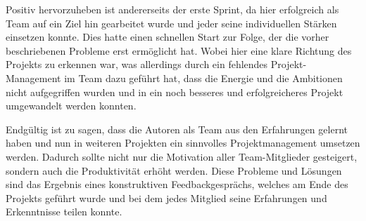 Positiv hervorzuheben ist andererseits der erste Sprint, da hier erfolgreich als Team auf ein Ziel hin gearbeitet wurde und jeder seine individuellen Stärken einsetzen konnte.
Dies hatte einen schnellen Start zur Folge, der die vorher beschriebenen Probleme erst ermöglicht hat.
Wobei hier eine klare Richtung des Projekts zu erkennen war, was allerdings durch ein fehlendes Projekt-Management im Team dazu geführt hat, dass die Energie und die Ambitionen nicht aufgegriffen wurden und in ein noch besseres und erfolgreicheres Projekt umgewandelt werden konnten.

Endgültig ist zu sagen, dass die Autoren als Team aus den Erfahrungen gelernt haben und nun in weiteren Projekten ein sinnvolles Projektmanagement umsetzen werden.
Dadurch sollte nicht nur die Motivation aller Team-Mitglieder gesteigert, sondern auch die Produktivität erhöht werden.
Diese Probleme und Lösungen sind das Ergebnis eines konstruktiven Feedbackgesprächs, welches am Ende des Projekts geführt wurde und bei dem jedes Mitglied seine Erfahrungen und Erkenntnisse teilen konnte.
